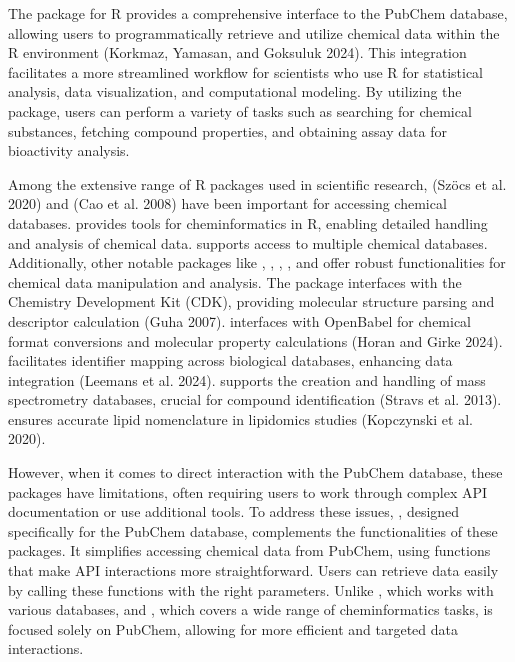 The  package for R provides a comprehensive interface to the PubChem database, allowing users to programmatically retrieve and utilize chemical data within the R environment (Korkmaz, Yamasan, and Goksuluk 2024). This integration facilitates a more streamlined workflow for scientists who use R for statistical analysis, data visualization, and computational modeling. By utilizing the  package, users can perform a variety of tasks such as searching for chemical substances, fetching compound properties, and obtaining assay data for bioactivity analysis.

Among the extensive range of R packages used in scientific research,  (Szöcs et al. 2020) and  (Cao et al. 2008) have been important for accessing chemical databases.  provides tools for cheminformatics in R, enabling detailed handling and analysis of chemical data.  supports access to multiple chemical databases. Additionally, other notable packages like , , , , and  offer robust functionalities for chemical data manipulation and analysis. The  package interfaces with the Chemistry Development Kit (CDK), providing molecular structure parsing and descriptor calculation (Guha 2007).  interfaces with OpenBabel for chemical format conversions and molecular property calculations (Horan and Girke 2024).  facilitates identifier mapping across biological databases, enhancing data integration (Leemans et al. 2024).  supports the creation and handling of mass spectrometry databases, crucial for compound identification (Stravs et al. 2013).  ensures accurate lipid nomenclature in lipidomics studies (Kopczynski et al. 2020).

However, when it comes to direct interaction with the PubChem database, these packages have limitations, often requiring users to work through complex API documentation or use additional tools. To address these issues, , designed specifically for the PubChem database, complements the functionalities of these packages. It simplifies accessing chemical data from PubChem, using functions that make API interactions more straightforward. Users can retrieve data easily by calling these functions with the right parameters. Unlike , which works with various databases, and , which covers a wide range of cheminformatics tasks,  is focused solely on PubChem, allowing for more efficient and targeted data interactions.

